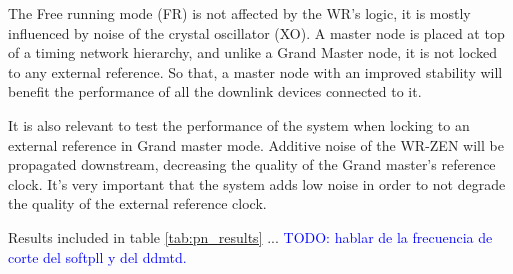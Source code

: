 The Free running mode (FR) is not affected by the WR's logic, it is mostly influenced by noise of the crystal oscillator (XO). A master node is placed at top of a timing network hierarchy, and unlike a Grand Master node, it is not locked to any external reference. So that, a master node with an improved stability will benefit the performance of all the downlink devices connected to it.

It is also relevant to test the performance of the system when locking to an external reference in Grand master mode. Additive noise of the WR-ZEN will be propagated downstream, decreasing the quality of the Grand master's reference clock. It's very important that the system adds low noise in order to not degrade the quality of the external reference clock.

Results included in table \ref{tab:pn_results} ... \textcolor{blue}{TODO: hablar de la frecuencia de corte del softpll y del ddmtd.}

%         
%         
%         
    

